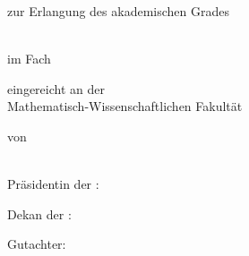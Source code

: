
\makeatletter
\begin{titlepage}
\begin{spacing}{1}
  \setlength{\parindentbak}{\parindent}
  \setlength{\parskipbak}{\parskip}

\setlength{\parindent}{0pt}
\setlength{\parskip}{\baselineskip}

\thispagestyle{empty}

\expandafter\Hu@titlepagefont\expandafter

\begin{center}
{\LARGE \textbf{\ifx\Hu@doctitle\empty{}\else\Hu@doctitle\fi}}


zur Erlangung des akademischen Grades

\ifx\Hu@degree\empty{}\else\Hu@degree\fi\\
im Fach
\ifx\Hu@subject\empty{}\else\Hu@subject\fi

eingereicht an der\\
Mathematisch-Wissenschaftlichen Fakult\"at\\
\ifx\Hu@university\empty{}\else\Hu@university\fi

von\\
\textbf{\ifx\Hu@authorprefix\empty{}\else\Hu@authorprefix\fi\ \ifx\Hu@authorfirstname\empty{}\else\Hu@authorfirstname\fi\ \ifx\Hu@authorsurname\empty{}\else\Hu@authorsurname\fi\ \ifx\Hu@authorsuffix\empty{}%
\else\Hu@authorsuffix\fi}\\
\ifx\Hu@authoradd\empty{}\else\Hu@authoradd\fi
\end{center}

\vfill

Pr\"asidentin der \ifx\Hu@university\empty{}\else\Hu@university\fi:\\
\ifx\Hu@president\empty{}\else\Hu@president\fi

Dekan der \ifx\Hu@faculty\empty{}\else\Hu@faculty\fi:\\
\ifx\Hu@dean\empty{}\else\Hu@dean\fi

Gutachter:
\begin{tplist} 
  \ifx\Hu@approvala\empty\item {}\else\item \Hu@approvala\fi
  \ifx\Hu@approvalb\empty\else\item \Hu@approvalb\fi
  \ifx\Hu@approvalc\empty\else\item \Hu@approvalc\fi
  \ifx\Hu@approvald\empty\else\item \Hu@approvald\fi
  \ifx\Hu@approvale\empty\else\item \Hu@approvale\fi
\end{tplist}


\end{spacing}
\end{titlepage}
